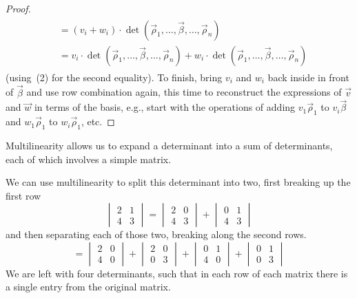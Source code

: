 \begin{proof}
\begin{multline*}
\begin{aligned}
    &=(v_i+w_i)\cdot\det (\vec{\rho}_1,\dots,\vec{\beta},\dots,\vec{\rho}_n) \\
    &=v_i\cdot \det (\vec{\rho}_1,\dots,\vec{\beta},\dots,\vec{\rho}_n)  
     +w_i\cdot \det (\vec{\rho}_1,\dots,\vec{\beta},\dots,\vec{\rho}_n)
  \end{aligned}
\end{multline*}
(using~(2) for the second equality).
To finish, bring $v_i$ and $w_i$ back inside in front of $\vec{\beta}$
and use row combination again, 
this time to reconstruct the expressions of $\vec{v}$
and $\vec{w}$ in terms of the basis, e.g., start with the operations
of adding $v_1\vec{\rho}_1$ to $v_i\vec{\beta}$ 
and $w_1\vec{\rho}_1$ to $w_i\vec{\rho}_1$, etc. 
\end{proof}

Multilinearity allows us to expand a determinant into a sum of
determinants, each of which involves a simple matrix.

\begin{example}
We can use multilinearity to split this determinant into two,
first breaking up the first row
\begin{equation*}
  \begin{vmatrix}
     2  &1  \\
     4  &3
  \end{vmatrix}
  =
  \begin{vmatrix}
     2  &0  \\
     4  &3
  \end{vmatrix}
  +
  \begin{vmatrix}
     0  &1  \\
     4  &3
  \end{vmatrix}
\end{equation*}
and then separating each of those two, breaking along the second rows.
\begin{equation*}
  =\begin{vmatrix}
     2  &0  \\
     4  &0
  \end{vmatrix}
  +
  \begin{vmatrix}
     2  &0  \\
     0  &3
  \end{vmatrix}
  +
  \begin{vmatrix}
     0  &1  \\
     4  &0
  \end{vmatrix}
  +
  \begin{vmatrix}
     0  &1  \\
     0  &3
  \end{vmatrix}
\end{equation*}
We are left with four determinants, such that 
in each row of each matrix there is
a single entry from the original matrix.
\end{example}


